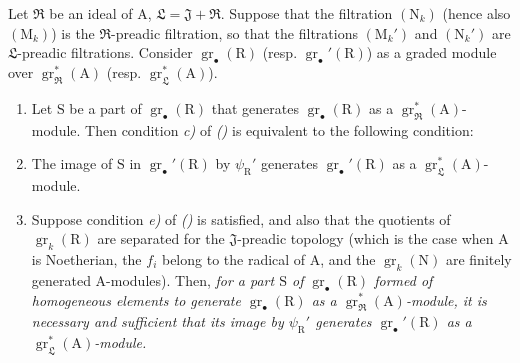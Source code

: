 \begin{corollary}[19.6.4]
\label{IV.19.6.4}
Let $\mathfrak{R}$ be an ideal of $\mathrm{A}$, $\mathfrak{L}=\mathfrak{J}+\mathfrak{R}$. Suppose that the filtration $(\mathrm{N}_k)$ (hence also $(\mathrm{M}_k)$) is the $\mathfrak{R}$-preadic filtration, so that the filtrations $(\mathrm{M}_k')$ and $(\mathrm{N}_k')$ are $\mathfrak{L}$-preadic filtrations. Consider $\operatorname{gr}_\bullet(\mathrm{R})$ (resp. $\operatorname{gr}_\bullet'(\mathrm{R})$) as a graded module over $\operatorname{gr}_\mathfrak{R}^*(\mathrm{A})$ (resp. $\operatorname{gr}_\mathfrak{L}^*(\mathrm{A})$).
\begin{enumerate}
\item[\rm(i)] Let $\mathrm{S}$ be a part of $\operatorname{gr}_\bullet(\mathrm{R})$ that generates $\operatorname{gr}_\bullet(\mathrm{R})$ as a $\operatorname{gr}_\mathfrak{R}^*(\mathrm{A})$-module. Then condition \emph{c)} of \emph{()} is equivalent to the following condition:
\item[\rm c$'$)] The image of $\mathrm{S}$ in $\operatorname{gr}_\bullet'(\mathrm{R})$ by $\psi_\mathrm{R}'$ generates $\operatorname{gr}_\bullet'(\mathrm{R})$ as a $\operatorname{gr}_\mathfrak{L}^*(\mathrm{A})$-module.
\item[\rm(ii)] Suppose condition \emph{e)} of \emph{()} is satisfied, and also that the quotients of $\operatorname{gr}_k(\mathrm{R})$ are separated for the $\mathfrak{J}$-preadic topology (which is the case when $\mathrm{A}$ is Noetherian, the $f_i$ belong to the radical of $\mathrm{A}$, and the $\operatorname{gr}_k(\mathrm{N})$ are finitely generated $\mathrm{A}$-modules). Then, \emph{for a part $\mathrm{S}$ of $\operatorname{gr}_\bullet(\mathrm{R})$ formed of homogeneous elements to generate $\operatorname{gr}_\bullet(\mathrm{R})$ as a $\operatorname{gr}_\mathfrak{R}^*(\mathrm{A})$-module, it is necessary and sufficient that its image by $\psi_\mathrm{R}'$ generates $\operatorname{gr}_\bullet'(\mathrm{R})$ as a $\operatorname{gr}_\mathfrak{L}^*(\mathrm{A})$-module.}
\end{enumerate}
\end{corollary}

